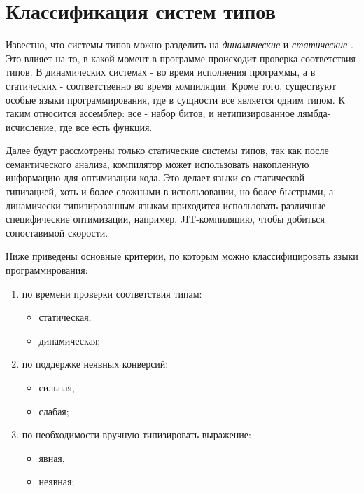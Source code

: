 \chapter{Классификация систем типов}
\label{ch:classification}

Известно, что системы типов можно разделить на \textit{динамические} и \textit{статические} \cite{Typing}.
Это влияет на то, в какой момент в программе происходит проверка соответствия типов.
В динамических системах - во время исполнения программы, а в статических - соответственно во время компиляции.
Кроме того, существуют особые языки программирования, где в сущности все является одним типом.
К таким относится ассемблер: все - набор битов, и нетипизированное лямбда-исчисление, где все есть функция.

Далее будут рассмотрены только статические системы типов, так как после семантического анализа, компилятор может использовать накопленную информацию для оптимизации кода.
Это делает языки со статической типизацией, хоть и более сложными в использовании, но более быстрыми, а динамически типизированным языкам приходится использовать различные специфические оптимизации, например, JIT-компиляцию, чтобы добиться сопоставимой скорости.

Ниже приведены основные критерии, по которым можно классифицировать языки программирования:

\begin{enumerate}
    \item по времени проверки соответствия типам:
    \begin{itemize}
        \item статическая,
        \item динамическая;
    \end{itemize}
    \item по поддержке неявных конверсий:
    \begin{itemize}
        \item сильная,
        \item слабая;
    \end{itemize}
    \item по необходимости вручную типизировать выражение:
    \begin{itemize}
        \item явная,
        \item неявная;
    \end{itemize}
\end{enumerate}

